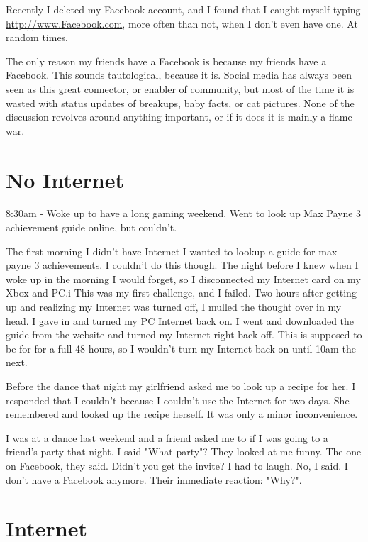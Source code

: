 \documentclass[12pt,letterpaper]{article}
\begin{document}
Recently I deleted my Facebook
account, and I found that I caught myself typing \url{http://www.Facebook.com}, more
often than not, when I don't even have one. At random times.

The only reason my friends have a Facebook is because my friends have a
Facebook. This sounds tautological, because it is. Social media has
always been seen as this great connector, or enabler of community, but
most of the time it is wasted  with status updates of breakups, baby
facts, or cat pictures. None of the discussion revolves around anything
important, or if it does it is mainly a flame war.


\section{No Internet}
8:30am - Woke up to have a long gaming weekend. Went to look up Max
Payne 3 achievement guide online, but couldn't.

The first morning I didn't have Internet I wanted to lookup a guide for
max payne 3 achievements. I couldn't do this though. The night before I
knew when I woke up in the morning I would forget, so I disconnected my
Internet card on my Xbox and PC.i This was my first challenge, and I
failed. Two hours after getting up and realizing my Internet was turned
off, I mulled the thought over in my head.  I gave in and turned my PC
Internet back on. I went and downloaded the guide from the website and
turned my Internet right back off. This is supposed to be for for a full
48 hours, so I wouldn't turn my Internet back on until 10am the next.


Before the dance that night my girlfriend asked me to look up a recipe
for her. I responded that I couldn't because I couldn't use the Internet
for two days. She remembered and looked up the recipe herself. It was
only a minor inconvenience.


I was at a dance last weekend and a friend asked me to if I was
going to a friend's party that night. I said "What party"? They looked
at me funny. The one on Facebook, they said. Didn't you get the invite?
I had to laugh. No, I said. I don't have a Facebook anymore. Their
immediate reaction: "Why?".

\section{Internet}
\end{document}

